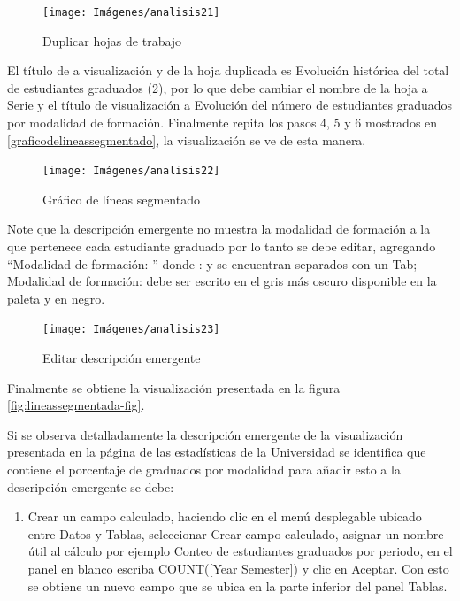 \documentclass[
]{book}
\providecommand{\tightlist}{%
  \setlength{\itemsep}{0pt}\setlength{\parskip}{0pt}}
\begin{document}
\begin{figure}

{\centering \texttt{[image: Imágenes/analisis21]} 

}

\caption{Duplicar hojas de trabajo}\label{fig:duplicarhoja-fig}
\end{figure}

El título de a visualización y de la hoja duplicada es Evolución histórica del total de estudiantes graduados (2), por lo que debe cambiar el nombre de la hoja a Serie y el título de visualización a Evolución del número de estudiantes graduados por modalidad de formación. Finalmente repita los pasos 4, 5 y 6 mostrados en \ref{graficodelineassegmentado}, la visualización se ve de esta manera.

\begin{figure}

{\centering \texttt{[image: Imágenes/analisis22]} 

}

\caption{Gráfico de líneas segmentado}\label{fig:lineassegmentadoporduplicacion-fig}
\end{figure}

Note que la descripción emergente no muestra la modalidad de formación a la que pertenece cada estudiante graduado por lo tanto se debe editar, agregando ``Modalidad de formación: '' donde : y se encuentran separados con un Tab; Modalidad de formación: debe ser escrito en el gris más oscuro disponible en la paleta y en negro.

\begin{figure}

{\centering \texttt{[image: Imágenes/analisis23]} 

}

\caption{Editar descripción emergente}\label{fig:lineassegmentadodescripcion-fig}
\end{figure}

Finalmente se obtiene la visualización presentada en la figura \ref{fig:lineassegmentada-fig}.

Si se observa detalladamente la descripción emergente de la visualización presentada en la página de las estadísticas de la Universidad se identifica que contiene el porcentaje de graduados por modalidad para añadir esto a la descripción emergente se debe:

\begin{enumerate}
\def\labelenumi{\arabic{enumi}.}
\tightlist
\item
  Crear un campo calculado, haciendo clic en el menú desplegable ubicado entre Datos y Tablas, seleccionar Crear campo calculado, asignar un nombre útil al cálculo por ejemplo Conteo de estudiantes graduados por periodo, en el panel en blanco escriba COUNT({[}Year Semester{]}) y clic en Aceptar. Con esto se obtiene un nuevo campo que se ubica en la parte inferior del panel Tablas.
\end{enumerate}
\end{document}

